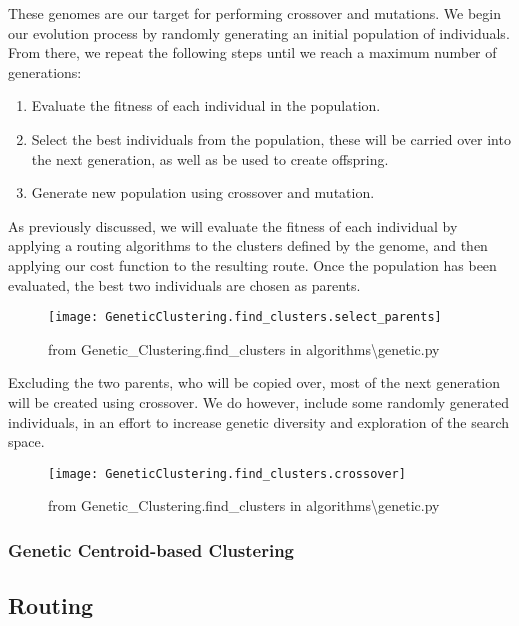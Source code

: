 \noindent
These genomes are our target for performing crossover and mutations.
We begin our evolution process by randomly generating an initial population of individuals.
From there, we repeat the following steps until we reach a maximum number of generations:
\begin{enumerate}
    \item Evaluate the fitness of each individual in the population.
    \item Select the best individuals from the population, these will be carried over into the next generation, as
    well as be used to create offspring.
    \item Generate new population using crossover and mutation.
\end{enumerate}

\noindent
As previously discussed, we will evaluate the fitness of each individual by applying a routing algorithms to the
clusters defined by the genome, and then applying our cost function to the resulting route.
Once the population has been evaluated, the best two individuals are chosen as parents.
\begin{figure}[H]\label{fig:Genetic_Clustering.find_clusters.select_parents}
    \centering
    \texttt{[image: GeneticClustering.find\_clusters.select\_parents]}
    \caption{from Genetic\_Clustering.find\_clusters in algorithms\textbackslash genetic.py}
\end{figure}

\noindent
Excluding the two parents, who will be copied over, most of the next generation will be created using crossover.
We do however, include some randomly generated individuals, in an effort to increase genetic diversity and
exploration of the search space.
\begin{figure}[H]\label{fig:GeneticClustering.find_clusters.crossover}
    \centering
    \texttt{[image: GeneticClustering.find\_clusters.crossover]}
    \caption{from Genetic\_Clustering.find\_clusters in algorithms\textbackslash genetic.py}
\end{figure}

\subsubsection{Genetic Centroid-based Clustering}

\subsection{Routing}\label{subsec:routing}
